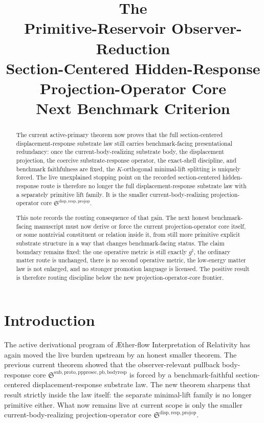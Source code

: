 \documentclass[11pt]{article}
\title{\textbf{The \TheoryName{}}\\[0.4em]
\large Primitive-Reservoir Observer-Reduction\\
\large Section-Centered Hidden-Response\\
\large Projection-Operator Core\\
\large Next Benchmark Criterion}
\author{}
\date{}
\newcommand{\Aflow}{\AE{}ther-flow}
\newcommand{\TheoryName}{\Aflow{} Interpretation of Relativity}
\newcommand{\CompletedMetric}{g^{\sharp}}
\newcommand{\ProjectionOperatorCore}{\mathfrak S^{\mathrm{disp,resp,projop}}}
\newcommand{\PullbackBodyResponseCore}{\mathfrak S^{\mathrm{sub,proto,pppresec,pb,bodyresp}}}
\begin{document}
\maketitle

\begin{abstract}
The current active-primary theorem now proves that the full section-centered displacement-response substrate law still carries benchmark-facing presentational redundancy: once the current-body-realizing substrate body, the displacement projection, the coercive substrate-response operator, the exact-shell discipline, and benchmark faithfulness are fixed, the \(K\)-orthogonal minimal-lift splitting is uniquely forced. The live unexplained stopping point on the recorded section-centered hidden-response route is therefore no longer the full displacement-response substrate law with a separately primitive lift family. It is the smaller current-body-realizing projection-operator core \(\ProjectionOperatorCore\).

This note records the routing consequence of that gain. The next honest benchmark-facing manuscript must now derive or force the current projection-operator core itself, or some nontrivial constituent or relation inside it, from still more primitive explicit substrate structure in a way that changes benchmark-facing status. The claim boundary remains fixed: the one operative metric is still exactly \(\CompletedMetric\), the ordinary matter route is unchanged, there is no second operative metric, the low-energy matter law is not enlarged, and no stronger promotion language is licensed. The positive result is therefore routing discipline below the new projection-operator-core frontier.
\end{abstract}

\section{Introduction}

The active derivational program of \TheoryName{} has again moved the live burden upstream by an honest smaller theorem. The previous current theorem showed that the observer-relevant pullback body-response core \(\PullbackBodyResponseCore\) is forced by a benchmark-faithful section-centered displacement-response substrate law. The new theorem sharpens that result strictly inside the law itself: the separate minimal-lift family is no longer primitive either. What now remains live at current scope is only the smaller current-body-realizing projection-operator core \(\ProjectionOperatorCore\).
\end{document}
